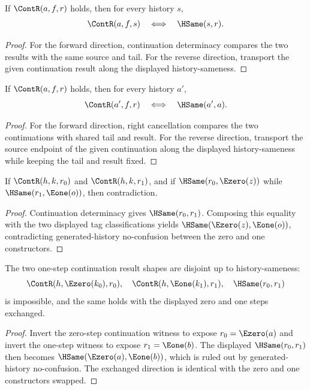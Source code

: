 \begin{theorem}
\label{thm:cont-result-hsame-iff}
If $\ContR(a,f,r)$ holds, then for every history $s$,
$$
\ContR(a,f,s)\quad\Longleftrightarrow\quad \HSame(s,r).
$$
\end{theorem}
\begin{proof}
For the forward direction, continuation determinacy compares the two results
with the same source and tail. For the reverse direction, transport the given
continuation result along the displayed history-sameness.
\end{proof}

\begin{theorem}
\label{thm:cont-source-hsame-iff}
If $\ContR(a,f,r)$ holds, then for every history $a'$,
$$
\ContR(a',f,r)\quad\Longleftrightarrow\quad \HSame(a',a).
$$
\end{theorem}
\begin{proof}
For the forward direction, right cancellation compares the two continuations
with shared tail and result. For the reverse direction, transport the source
endpoint of the given continuation along the displayed history-sameness while
keeping the tail and result fixed.
\end{proof}

\begin{theorem}
\label{thm:cont-result-hsame-tag-separation}
If $\ContR(h,k,r_0)$ and $\ContR(h,k,r_1)$, and if
$\HSame(r_0,\Ezero(z))$ while $\HSame(r_1,\Eone(o))$, then contradiction.
\end{theorem}
\begin{proof}
Continuation determinacy gives $\HSame(r_0,r_1)$.  Composing this equality with
the two displayed tag classifications yields
$\HSame(\Ezero(z),\Eone(o))$, contradicting generated-history no-confusion
between the zero and one constructors.
\end{proof}

\begin{theorem}
\label{thm:cont-step-result-hsame-no-confusion-pair}
The two one-step continuation result shapes are disjoint up to history-sameness:
$$
\ContR(h,\Ezero(k_0),r_0),\quad
\ContR(h,\Eone(k_1),r_1),\quad
\HSame(r_0,r_1)
$$
is impossible, and the same holds with the displayed zero and one steps
exchanged.
\end{theorem}
\begin{proof}
Invert the zero-step continuation witness to expose
$r_0=\Ezero(a)$ and invert the one-step witness to expose $r_1=\Eone(b)$.
The displayed $\HSame(r_0,r_1)$ then becomes
$\HSame(\Ezero(a),\Eone(b))$, which is ruled out by generated-history
no-confusion.  The exchanged direction is identical with the zero and one
constructors swapped.
\end{proof}

